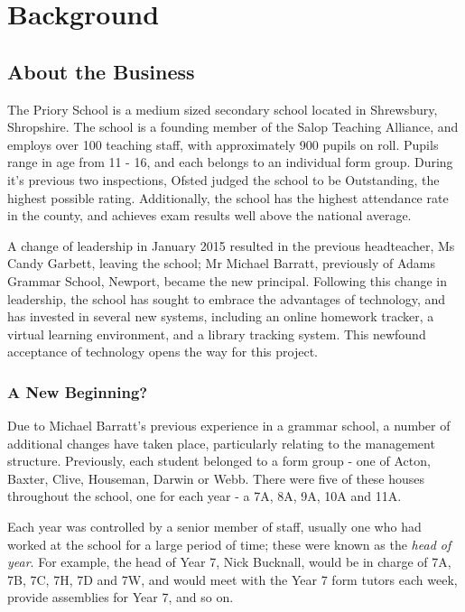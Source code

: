 \section{Background}

\subsection{About the Business}

The Priory School is a medium sized secondary school located in Shrewsbury, Shropshire. The school is a founding member of the Salop Teaching Alliance, and employs over 100 teaching staff, with approximately 900 pupils on roll. Pupils range in age from 11 - 16, and each belongs to an individual form group. During it's previous two inspections, Ofsted judged the school to be Outstanding, the highest possible rating. Additionally, the school has the highest attendance rate in the county, and achieves exam results well above the national average. 

A change of leadership in January 2015 resulted in the previous headteacher, Ms Candy Garbett, leaving the school; Mr Michael Barratt, previously of Adams Grammar School, Newport, became the new principal. Following this change in leadership, the school has sought to embrace the advantages of technology, and has invested in several new systems, including an online homework tracker, a virtual learning environment, and a library tracking system. This newfound acceptance of technology opens the way for this project.

\subsubsection{A New Beginning?}
Due to Michael Barratt's previous experience in a grammar school, a number of additional changes have taken place, particularly relating to the management structure. Previously, each student belonged to a form group - one of Acton, Baxter, Clive, Houseman, Darwin or Webb. There were five of these houses throughout the school, one for each year - a 7A, 8A, 9A, 10A and 11A.

 Each year was controlled by a senior member of staff, usually one who had worked at the school for a large period of time; these were known as the \textit{head of year}. For example, the head of Year 7, Nick Bucknall, would be in charge of 7A, 7B, 7C, 7H, 7D and 7W, and would meet with the Year 7 form tutors each week, provide assemblies for Year 7, and so on. 

